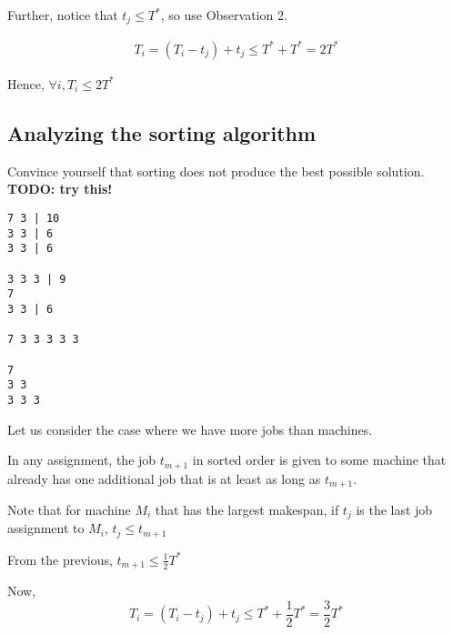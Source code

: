 Further, notice that $t_j \leq T^*$, so use Observation 2.

\begin{align*}
T_i = (T_i - t_j) + t_j \leq T^* + T^* = 2T^*
\end{align*}

Hence, $\forall i, T_i \leq 2 T^*$

\subsection{Analyzing the sorting algorithm}

Convince yourself that sorting does not produce the best possible solution.
\textbf{TODO: try this!}
\begin{verbatim}
7 3 | 10
3 3 | 6
3 3 | 6

3 3 3 | 9
7
3 3 | 6

7 3 3 3 3 3

7
3 3
3 3 3
\end{verbatim}

Let us consider the case where we have more jobs than machines.

In any assignment, the job $t_{m+1}$ in sorted order
is given to some machine that already has one additional job
that is at least as long as $t_{m+1}$.

Note that for machine $M_i$ that has the largest makespan, if $t_j$
is the last job assignment to $M_i$, $t_j \leq t_{m+1}$

From the previous, $t_{m+1} \leq \frac{1}{2} T^*$

Now, $$T_i = (T_i - t_j) + t_j  \leq T^* + \frac{1}{2} T^* = \frac{3}{2} T^*$$



